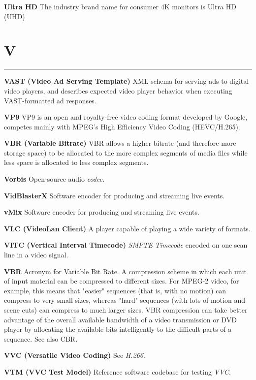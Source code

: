 \smallskip
\textbf{Ultra HD}
The industry brand name for consumer 4K monitors is Ultra HD (UHD)

\section{V}
\hrule

\medskip
\textbf{VAST (Video Ad Serving Template)}
XML schema for serving ads to digital video players, and describes expected video player behavior when executing VAST-formatted ad responses.

\smallskip
\textbf{VP9}
VP9 is an open and royalty-free video coding format developed by Google, competes mainly with MPEG's High Efficiency Video Coding (HEVC/H.265).

\smallskip
\textbf{VBR (Variable Bitrate)}
VBR allows a higher bitrate (and therefore more storage space) to be allocated to the more complex segments of media files while less space is allocated to less complex segments.

\smallskip
\textbf{Vorbis}
Open-source audio \textit{codec}.

\smallskip
\textbf{VidBlasterX}
Software encoder for producing and streaming live events.

\smallskip
\textbf{vMix}
Software encoder for producing and streaming live events.

\smallskip
\textbf{VLC (VideoLan Client)}
A player capable of playing a wide variety of formats.

\smallskip
\textbf{VITC (Vertical Interval Timecode)}
\textit{SMPTE} \textit{Timecode} encoded on one scan line in a video signal.

\smallskip
\textbf{VBR}
Acronym for Variable Bit Rate. A compression scheme in which each unit of input material can be compressed to different sizes. For MPEG-2 video, for example, this means that "easier" sequences (that is, with no motion) can compress to very small sizes, whereas "hard" sequences (with lots of motion and scene cuts) can compress to much larger sizes. VBR compression can take better advantage of the overall available bandwidth of a video transmission or DVD player by allocating the available bits intelligently to the difficult parts of a sequence. See also CBR.

\smallskip
\textbf{VVC (Versatile Video Coding)}
See \textit{H.266}.

\smallskip
\textbf{VTM (VVC Test Model)}
Reference software codebase for testing \textit{VVC}.


